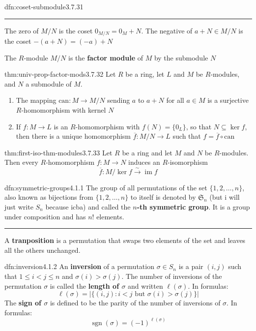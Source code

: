 \documentclass[landscape, 8pt]{extarticle}
\DeclareMathOperator{\im}{im}
\DeclareMathOperator{\sgn}{sgn}
\begin{document}
\begin{multicols}{3}
\begin{dfn}{dfn:coset-submodule}{3.7.31}
    \noindent\rule{\textwidth}{0.2pt}
    The zero of $M / N$ is the coset $0_{M /N} = 0_{M} + N$. The negative of $a + N\in M / N$ is the coset $-(a + N) = (-a) + N$

    The $R$-module $M / N$ is the \textbf{factor module} of $M$ by the submodule $N$
\end{dfn}

\begin{thm}{thm:univ-prop-factor-mods}{3.7.32}
    Let $R$ be a ring, let $L$ and $M$ be $R$-modules, and $N$ a submodule of $M$.
    \begin{enumerate}
        \setlength\itemsep{0em}
        \item The mapping $\text{can} : M\to M /N$ sending $a$ to $a + N$ for all $a\in M$ is a surjective $R$-homomorphism with kernel $N$
        \item If $f : M\to L$ is an $R$-homomorphism with $f(N) = \{0_{L}\}$, so that $N \subseteq \ker f$, then there is a unique homomorphism $\overline{f} : M /N \to L$ such that $f = \overline{f} \circ \text{can}$
    \end{enumerate}
\end{thm}

\begin{thm}{thm:first-iso-thm-modules}{3.7.33}
    Let $R$ be a ring and let $M$ and $N$ be $R$-modules. Then every $R$-homomorphism $f : M\to N$ induces an $R$-isomorphism
    \[\overline{f} : M / \ker f \xrightarrow{\sim} \im f\]
\end{thm}

\begin{dfn}{dfn:symmetric-groups}{4.1.1}
    The group of all permutations of the set $\{1,2,\dots,n\}$, also known as bijections from $\{1,2,\dots,n\}$ to itself is denoted by $\mathfrak{S}_{n}$ (but i will just write $S_{n}$ because icba) and called the \textbf{$n$-th symmetric group}. It is a group under composition and has $n!$ elements.

    \noindent\rule{\textwidth}{0.2pt}
    A \textbf{tranposition} is a permutation that swaps two elements of the set and leaves all the others unchanged.
\end{dfn}

\begin{dfn}{dfn:inversion}{4.1.2}
    An \textbf{inversion} of a permutation $\sigma\in S_{n}$ is a pair $(i, j)$ such that $1 \le i < j \le n$ and $\sigma(i) > \sigma(j)$. The number of inversions of the permutation $\sigma$ is called the \textbf{length of $\sigma$} and written $\ell(\sigma)$. In formulas:
    \[\ell(\sigma) = \lvert \{(i,j) : i < j \text{ but } \sigma(i) > \sigma(j)\} \rvert\]
    The \textbf{sign of $\sigma$} is defined to be the parity of the number of inversions of $\sigma$. In formulas:
    \[\sgn(\sigma) = (-1)^{\ell(\sigma)}\]
\end{dfn}


\end{multicols}
\end{document}
